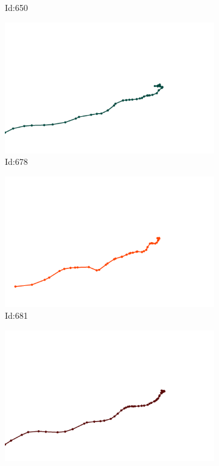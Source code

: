 \documentclass[12pt,twoside]{report}
\begin{document}
\begin{figure}
\begin{subfigure}[b]{0.20\textwidth}
\caption{Id:650}
\end{subfigure}
\begin{subfigure}[b]{0.20\textwidth}
\centering
\includegraphics[width=\textwidth]{../trajectories/678.png}
\caption{Id:678}
\end{subfigure}
\begin{subfigure}[b]{0.20\textwidth}
\centering
\includegraphics[width=\textwidth]{../trajectories/681.png}
\caption{Id:681}
\end{subfigure}
\begin{subfigure}[b]{0.20\textwidth}
\centering
\includegraphics[width=\textwidth]{../trajectories/694.png}

\end{subfigure}
\end{figure}
\end{document}
